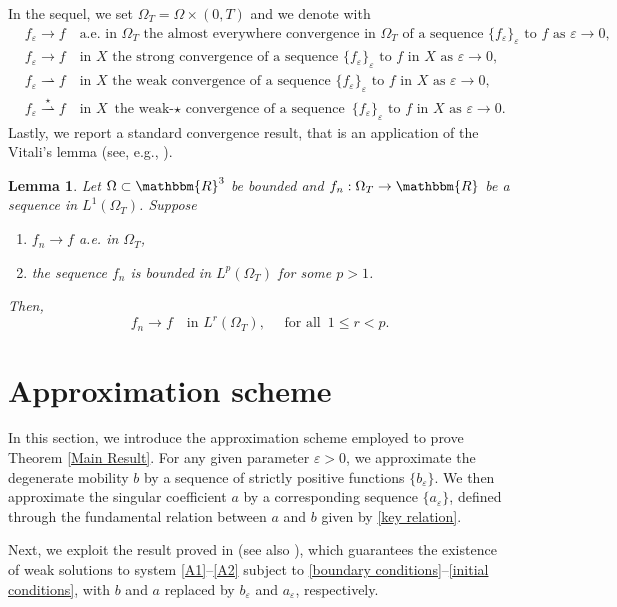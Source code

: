 \documentclass[11pt,  reqno]{amsart}%
\theoremstyle{plain}
\newtheorem{lemma}[theorem]{Lemma}
\theoremstyle{definition}
\theoremstyle{remark}
\numberwithin{equation}{section}
\newcommand{\ve}{\varepsilon}
\begin{document}
In the sequel, we set $\Omega_T= \Omega \times (0,T)$ and we denote with
\begin{align*}
    & f_\ve \to f \quad \mbox{a.e. in } \Omega_T \mbox{ the almost everywhere convergence in } \Omega_T \mbox{ of a sequence }\{f_\ve\}_\ve \mbox{ to } f \mbox{ as } \ve \to 0,
    \\[3pt]
    & f_\ve \to f \quad \mbox{in }X \mbox{ the strong convergence of a sequence }\{f_\ve\}_\ve \mbox{ to } f \mbox{ in } X \mbox{ as } \ve \to 0,\\[3pt]
     & f_\ve \rightharpoonup f \quad \mbox{in }X \mbox{ the weak convergence of a sequence }\{f_\ve\}_\ve \mbox{ to } f \mbox{ in } X \mbox{ as } \ve \to 0,\\[3pt]
      & f_\ve  \overset{\star}{\rightharpoonup} f \quad \mbox{in }X \mbox{ the weak-$\star$ convergence of a sequence }\{f_\ve\}_\ve \mbox{ to } f \mbox{ in } X \mbox{ as } \ve \to 0.
\end{align*}
Lastly, we report a standard convergence result, that is an application of the Vitali's lemma (see, e.g., \cite{E1990}). 
\begin{lemma}\label{convergenza alla Vitali}
 Let $\Omega \subset \mathbbm{R}^3$ be bounded and $f_n: \Omega_T  \to \mathbbm{R}$ be a sequence in $L^1( \Omega_T )$. Suppose 
    \begin{enumerate}
        \item $f_n \to f$ a.e. in $\Omega_T$,
        \item the sequence $f_n$ is bounded in $L^p( \Omega_T )$ for some $p>1$.
    \end{enumerate}
    Then,
    $$
    f_n \to f \quad \mbox{in }L^r( \Omega_T), \quad \text{ for all } \, 1 \le r <p.
    $$
\end{lemma}

\section{Approximation scheme}
\label{Approximation}
In this section, we introduce the approximation scheme employed to prove Theorem \ref{Main Result}. For any given parameter $\varepsilon>0$, we approximate the degenerate mobility $b$ by a sequence of strictly positive functions $\lbrace b_\ve \rbrace$. We then approximate the singular coefficient $a$ by a corresponding sequence $\lbrace a_\ve \rbrace$, defined through the fundamental relation between $a$ and $b$ given by \eqref{key relation}.
    
 Next, we exploit the result proved in \cite{CGGS2025} (see also \cite{SP2011}), which guarantees the existence of weak solutions to system \eqref{A1}--\eqref{A2} subject to \eqref{boundary conditions}--\eqref{initial conditions}, with $b$ and $a$ replaced by $b_\ve$ and $a_\ve$, respectively. 
	
\end{document}
